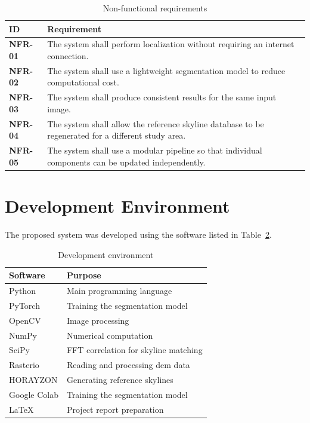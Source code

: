 \begin{table}[H]
\centering
\caption{Non-functional requirements}
\label{tab:nonfunctional_requirements}
\begin{tabularx}{\textwidth}{>{\bfseries}l X}
\toprule
ID & Requirement \\
\midrule
NFR-01 & The system shall perform localization without requiring an internet connection. \\
NFR-02 & The system shall use a lightweight segmentation model to reduce computational cost. \\
NFR-03 & The system shall produce consistent results for the same input image. \\
NFR-04 & The system shall allow the reference skyline database to be regenerated for a different study area. \\
NFR-05 & The system shall use a modular pipeline so that individual components can be updated independently. \\
\bottomrule
\end{tabularx}
\end{table}

\section{Development Environment}

The proposed system was developed using the software listed in Table~\ref{tab:development_environment}.

\begin{table}[H]
\centering
\caption{Development environment}
\label{tab:development_environment}
\begin{tabular}{ll}
\toprule
Software & Purpose \\
\midrule
Python & Main programming language \\
PyTorch & Training the segmentation model \\
OpenCV & Image processing \\
NumPy & Numerical computation \\
SciPy & FFT correlation for skyline matching \\
Rasterio & Reading and processing \Gls{dem} data \\
HORAYZON & Generating reference skylines \\
Google Colab & Training the segmentation model \\
\LaTeX & Project report preparation \\
\bottomrule
\end{tabular}
\end{table}
